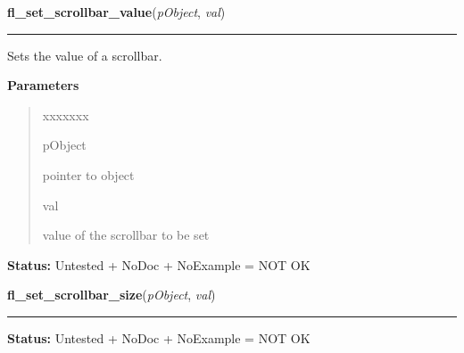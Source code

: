 \hspace{.8\funcindent}\begin{boxedminipage}{\funcwidth}

    \raggedright \textbf{fl\_set\_scrollbar\_value}(\textit{pObject}, \textit{val})

    \vspace{-1.5ex}

    \rule{\textwidth}{0.5\fboxrule}
\setlength{\parskip}{2ex}
    Sets the value of a scrollbar.

\setlength{\parskip}{1ex}
      \textbf{Parameters}
      \vspace{-1ex}

      \begin{quote}
        \begin{Ventry}{xxxxxxx}

          \item[pObject]

          pointer to object

          \item[val]

          value of the scrollbar to be set

        \end{Ventry}

      \end{quote}

\textbf{Status:} Untested + NoDoc + NoExample = NOT OK



    \end{boxedminipage}

    \label{xformslib:library:fl_set_scrollbar_size}

    \vspace{0.5ex}

\hspace{.8\funcindent}\begin{boxedminipage}{\funcwidth}

    \raggedright \textbf{fl\_set\_scrollbar\_size}(\textit{pObject}, \textit{val})

    \vspace{-1.5ex}

    \rule{\textwidth}{0.5\fboxrule}
\setlength{\parskip}{2ex}
\setlength{\parskip}{1ex}
\textbf{Status:} Untested + NoDoc + NoExample = NOT OK



    \end{boxedminipage}

